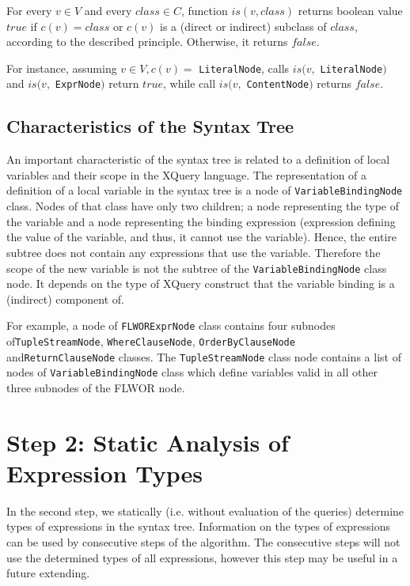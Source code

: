 \begin{define}For every $v \in V$ and every $class \in C$, function $is(v, class)$ returns boolean value $true$ if $c(v) = class$ or $c(v)$ is a (direct or indirect) subclass of $class$, according to the described principle. Otherwise, it returns $false$.
\end{define}

For instance, assuming $v \in V, c(v) =$ \texttt{LiteralNode}, calls $is(v,$ \texttt{LiteralNode}$)$ and $is(v,$ \texttt{ExprNode}$)$ return $true$, while call $is(v,$ \texttt{ContentNode}$)$ returns $false$.

\subsection{Characteristics of the Syntax Tree}
An important characteristic of the syntax tree is related to a definition of local variables and their scope in the XQuery language. The representation of a definition of a local variable in the syntax tree is a node of \texttt{VariableBindingNode} class. Nodes of that class have only two children; a node representing the type of the variable and a node representing the binding expression (expression defining the value of the variable, and thus, it cannot use the variable). Hence, the entire subtree does not contain any expressions that use the variable. Therefore the scope of the new variable is not the subtree of the \texttt{VariableBindingNode} class node. It depends on the type of XQuery construct that the variable binding is a (indirect) component of.

For example, a node of \texttt{FLWORExprNode} class contains four subnodes of\linebreak \texttt{TupleStreamNode}, \texttt{WhereClauseNode}, \texttt{OrderByClauseNode} and\linebreak \texttt{ReturnClauseNode} classes. The \texttt{TupleStreamNode} class node contains a list of nodes of \texttt{VariableBindingNode} class which define variables valid in all other three subnodes of the FLWOR node.



\section{Step 2: Static Analysis of Expression Types}
In the second step, we statically (i.e. without evaluation of the queries) determine types of expressions in the syntax tree. Information on the types of expressions can be used by consecutive steps of the algorithm. The consecutive steps will not use the determined types of all expressions, however this step may be useful in a future extending.


